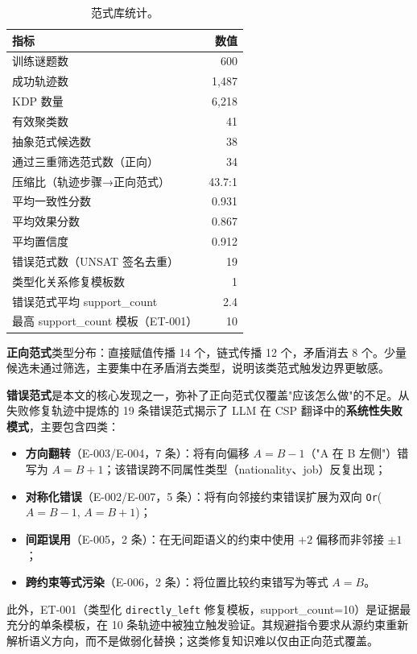 \documentclass[UTF8,a4paper,12pt]{ctexart}
\begin{document}
\begin{table}[t]
  \centering
  \caption{范式库统计。}
  \label{tab:library}
  \begin{tabular}{lr}
    \toprule
    指标 & 数值 \\
    \midrule
    训练谜题数 & 600 \\
    成功轨迹数 & 1,487 \\
    KDP 数量 & 6,218 \\
    有效聚类数 & 41 \\
    抽象范式候选数 & 38 \\
    通过三重筛选范式数（正向） & 34 \\
    压缩比（轨迹步骤→正向范式） & 43.7:1 \\
    平均一致性分数 & 0.931 \\
    平均效果分数 & 0.867 \\
    平均置信度 & 0.912 \\
    \midrule
    错误范式数（UNSAT 签名去重） & 19 \\
    类型化关系修复模板数 & 1 \\
    错误范式平均 support\_count & 2.4 \\
    最高 support\_count 模板（ET-001） & 10 \\
    \bottomrule
  \end{tabular}
\end{table}

\textbf{正向范式}类型分布：直接赋值传播 14 个，链式传播 12 个，矛盾消去 8 个。少量候选未通过筛选，主要集中在矛盾消去类型，说明该类范式触发边界更敏感。

\textbf{错误范式}是本文的核心发现之一，弥补了正向范式仅覆盖"应该怎么做"的不足。从失败修复轨迹中提炼的 19 条错误范式揭示了 LLM 在 CSP 翻译中的\textbf{系统性失败模式}，主要包含四类：
\begin{itemize}
  \item \textbf{方向翻转}（E-003/E-004，7 条）：将有向偏移 \(A = B - 1\)（"A 在 B 左侧"）错写为 \(A = B + 1\)；该错误跨不同属性类型（nationality、job）反复出现；
  \item \textbf{对称化错误}（E-002/E-007，5 条）：将有向邻接约束错误扩展为双向 \texttt{Or}(\(A=B{-}1\), \(A=B{+}1\))；
  \item \textbf{间距误用}（E-005，2 条）：在无间距语义的约束中使用 \(+2\) 偏移而非邻接 \(\pm1\)；
  \item \textbf{跨约束等式污染}（E-006，2 条）：将位置比较约束错写为等式 \(A = B\)。
\end{itemize}
此外，ET-001（类型化 \texttt{directly\_left} 修复模板，support\_count=10）是证据最充分的单条模板，在 10 条轨迹中被独立触发验证。其规避指令要求从源约束重新解析语义方向，而不是做弱化替换；这类修复知识难以仅由正向范式覆盖。
\end{document}

